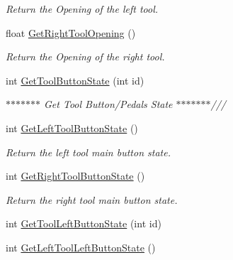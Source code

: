 \begin{DoxyCompactItemize}
\begin{DoxyCompactList}\small\item\em Return the Opening of the left tool. \item\end{DoxyCompactList}\item 
\hypertarget{classvtkIHP_ad8a083f4ff616190041b403f9db80fa2}{
float \hyperlink{classvtkIHP_ad8a083f4ff616190041b403f9db80fa2}{GetRightToolOpening} ()}
\label{classvtkIHP_ad8a083f4ff616190041b403f9db80fa2}

\begin{DoxyCompactList}\small\item\em Return the Opening of the right tool. \item\end{DoxyCompactList}\item 
int \hyperlink{classvtkIHP_a5679a7f0539274650ba046cbf5e0535a}{GetToolButtonState} (int id)
\begin{DoxyCompactList}\small\item\em $\ast$$\ast$$\ast$$\ast$$\ast$$\ast$$\ast$ Get Tool Button/Pedals State $\ast$$\ast$$\ast$$\ast$$\ast$$\ast$$\ast$/// \item\end{DoxyCompactList}\item 
\hypertarget{classvtkIHP_ac2d6929beadef05098c58e074986225c}{
int \hyperlink{classvtkIHP_ac2d6929beadef05098c58e074986225c}{GetLeftToolButtonState} ()}
\label{classvtkIHP_ac2d6929beadef05098c58e074986225c}

\begin{DoxyCompactList}\small\item\em Return the left tool main button state. \item\end{DoxyCompactList}\item 
\hypertarget{classvtkIHP_acadda8d0d05c54dfe3415088404b3c06}{
int \hyperlink{classvtkIHP_acadda8d0d05c54dfe3415088404b3c06}{GetRightToolButtonState} ()}
\label{classvtkIHP_acadda8d0d05c54dfe3415088404b3c06}

\begin{DoxyCompactList}\small\item\em Return the right tool main button state. \item\end{DoxyCompactList}\item 
int \hyperlink{classvtkIHP_af7a915155ec7b4e77ea788080ec7bda9}{GetToolLeftButtonState} (int id)
\item 
\hypertarget{classvtkIHP_ac5a7c72d0ee9585abdcaeb23955f2bea}{
int \hyperlink{classvtkIHP_ac5a7c72d0ee9585abdcaeb23955f2bea}{GetLeftToolLeftButtonState} ()}
\label{classvtkIHP_ac5a7c72d0ee9585abdcaeb23955f2bea}


\end{DoxyCompactItemize}
